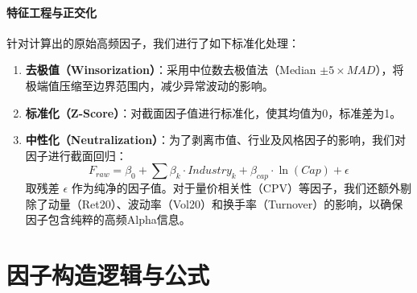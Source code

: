 \documentclass[10pt,compsoc,UTF8]{CjC}
\begin{document}
\paragraph{特征工程与正交化}
针对计算出的原始高频因子，我们进行了如下标准化处理：
\begin{enumerate}
    \item \textbf{去极值（Winsorization）}：采用中位数去极值法（Median $\pm 5 \times MAD$），将极端值压缩至边界范围内，减少异常波动的影响。
    \item \textbf{标准化（Z-Score）}：对截面因子值进行标准化，使其均值为0，标准差为1。
    \item \textbf{中性化（Neutralization）}：为了剥离市值、行业及风格因子的影响，我们对因子进行截面回归：
    \begin{equation}
        F_{raw} = \beta_0 + \sum \beta_k \cdot Industry_k + \beta_{cap} \cdot \ln(Cap) + \epsilon
    \end{equation}
    取残差 $\epsilon$ 作为纯净的因子值。对于量价相关性（CPV）等因子，我们还额外剔除了动量（Ret20）、波动率（Vol20）和换手率（Turnover）的影响，以确保因子包含纯粹的高频Alpha信息。
\end{enumerate}

\section{因子构造逻辑与公式}

\renewcommand{\arraystretch}{1.5} %
\end{document}
